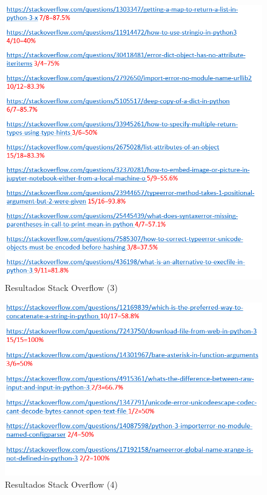 \documentclass[a4paper, 12pt]{book}
\begin{document}
\begin{figure}
	\centering
    \includegraphics[width=1\textwidth]{img/stack7}
    \caption{Resultados Stack Overflow (3)}
    \label{figura:stack7}
 \end{figure}
 
\begin{figure}
	\centering
    \includegraphics[width=1\textwidth]{img/stack8}
    \caption{Resultados Stack Overflow (4)}
    \label{figura:stack8}
 \end{figure}
 
\end{document}
